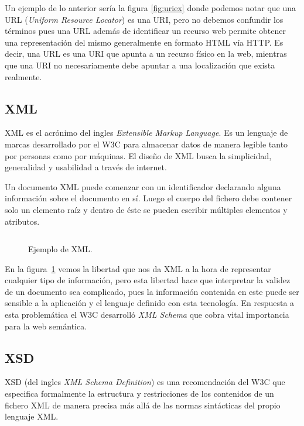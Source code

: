 Un ejemplo de lo anterior sería la figura \ref{fig:uriex} donde podemos notar
que una URL (\emph{Uniform Resource Locator}) es una URI, pero no debemos
confundir los términos pues una URL además de identificar un recurso web permite
obtener una representación del mismo generalmente en formato HTML vía HTTP. Es
decir, una URL es una URI que apunta a un recurso físico en la web, mientras que
una URI no necesariamente debe apuntar a una localización que exista realmente.

\subsection{XML}
XML es el acrónimo del ingles \emph{Extensible Markup Language}. Es un
lenguaje de marcas desarrollado por el W3C para almacenar datos de manera
legible tanto por personas como por máquinas. 
El diseño de XML busca la simplicidad, generalidad y usabilidad a través de
internet\cite{paoli2004extensible}. 

Un documento XML puede comenzar con un identificador declarando alguna
información sobre el documento en sí. Luego el cuerpo del fichero debe contener
solo un elemento raíz y dentro de éste se pueden escribir múltiples elementos y
atributos.

\begin{figure}[htpb]
  \centering
  \begin{tabular}{c}
    
  \end{tabular}
  \caption{Ejemplo de XML.}
  \vspace{-.25cm}
  \label{fig:xmlex}
\end{figure}

En la figura~\ref{fig:xmlex} vemos la libertad que nos da XML a la hora de
representar cualquier tipo de información, pero esta libertad hace que
interpretar la validez de un documento sea complicado, pues la información
contenida en este puede ser sensible a la aplicación y el lenguaje definido con
esta tecnología. En respuesta a esta problemática el W3C desarrolló \emph{XML
Schema} que cobra vital importancia para la web semántica.

\subsection{XSD}
XSD (del ingles \emph{XML Schema Definition}) es una recomendación del W3C que
especifica formalmente la estructura y restricciones de los contenidos de un
fichero XML de manera precisa más allá de las normas sintácticas del propio
lenguaje XML.

